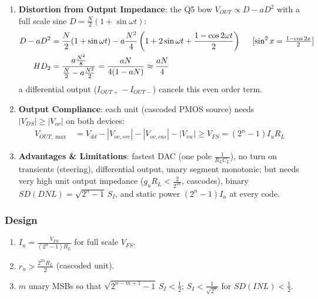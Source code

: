 \begin{enumerate}
    \paragraph{At Output:} \(Z_{out} = R_L \parallel \frac{1}{D g_u}\) (code dependent through \(D g_u\), the source of the INL bow).
  \item \textbf{Distortion from Output Impedance}: the Q5 bow \(V_{OUT} \propto D - aD^2\) with a full scale sine
    \(D = \frac{N}{2}(1 + \sin\omega t)\):
    \begin{align*}
      D - aD^2 &= \frac{N}{2}(1 + \sin\omega t) - a\frac{N^2}{4}\left(1 + 2\sin\omega t + \frac{1 - \cos 2\omega t}{2}\right) \hspace{0.5cm} [\sin^2 x = \tfrac{1 - \cos 2x}{2}] \\
      HD_2 &= \frac{a\frac{N^2}{8}}{\frac{N}{2} - a\frac{N^2}{2}} = \frac{aN}{4(1 - aN)} \approx \frac{aN}{4}
    \end{align*}
    a differential output (\(I_{OUT+} - I_{OUT-}\)) cancels this even order term.
  \item \textbf{Output Compliance}: each unit (cascoded PMOS source) needs \(|V_{DS}| \geq |V_{ov}|\) on both devices:
    \begin{align*}
      V_{OUT,\max} &= V_{dd} - |V_{ov,src}| - |V_{ov,cas}| - |V_{sw}| \geq V_{FS} = (2^n - 1) I_u R_L
    \end{align*}
  \item \textbf{Advantages \& Limitations}: fastest DAC (one pole \(\frac{1}{R_L C_L}\)), no turn on transients
    (steering), differential output, unary segment monotonic; but needs very high unit output
    impedance (\(g_u R_L < \frac{2}{2^{2n}}\), cascodes), binary \(SD(DNL) = \sqrt{2^n - 1}\,S_I\), and static power
    \((2^n - 1) I_u\) at every code.
\end{enumerate}

\subsubsection{Design}
\begin{enumerate}
  \item \(I_u = \frac{V_{FS}}{(2^n - 1) R_L}\) for full scale \(V_{FS}\).
  \item \(r_u > \frac{2^{2n} R_L}{2}\) (cascoded unit).
  \item \(m\) unary MSBs so that \(\sqrt{2^{n-m+1} - 1}\, S_I < \frac{1}{2}\); \(S_I < \frac{1}{\sqrt{2^n}}\) for \(SD(INL) < \frac{1}{2}\).
\end{enumerate}


